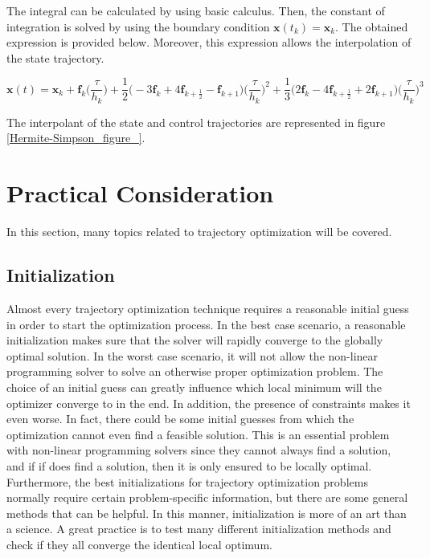 \documentclass{thesisreport}
\begin{document}
The integral can be calculated by using basic calculus. Then, the constant of integration is solved by using the boundary condition $\bm{x}(t_k) = \bm{x}_k$. The obtained expression is provided below. Moreover, this expression allows the interpolation of the state trajectory.

\begin{equation}
	\bm{x}(t)= \bm{x}_k + \bm{f}_k \bigg(\frac{\tau}{h_k}\bigg) +\frac{1}{2}\bigg(-3 \bm{f}_k + 4 \bm{f}_{k+\frac{1}{2}} - \bm{f}_{k+1}\bigg) \bigg(\frac{\tau}{h_k}\bigg)^2 + \frac{1}{3} \bigg(2 \bm{f}_k -4\bm{f}_{k+ \frac{1}{2}} + 2 \bm{f}_{k+1} \bigg) \bigg(\frac{\tau}{h_k}\bigg)^3
\end{equation}

The interpolant of the state and control trajectories are represented in figure \ref{Hermite-Simpson_figure_}.


\section{Practical Consideration}

In this section, many topics related to trajectory optimization will be covered.


\subsection{Initialization}

Almost every trajectory optimization technique requires a reasonable initial guess in order to start the optimization process. In the best case scenario, a reasonable initialization makes sure that the solver will rapidly converge to the globally optimal solution. In the worst case scenario, it will not allow the non-linear programming solver to solve an otherwise proper optimization problem. The choice of an initial guess can greatly influence which local minimum will the optimizer converge to in the end. In addition, the presence of constraints makes it even worse. In fact, there could be some initial guesses from which the optimization cannot even find a feasible solution. This is an essential problem with non-linear programming solvers since they cannot always find a solution, and if if does find a solution, then it is only ensured to be locally optimal. Furthermore, the best initializations for trajectory optimization problems normally require certain problem-specific information, but there are some general methods that can be helpful. In this manner, initialization is more of an art than a science. A great practice is to test many different initialization methods and check if they all converge the identical local optimum.
\end{document}

